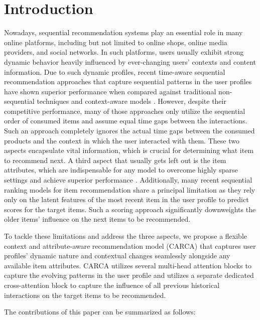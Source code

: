 \documentclass[sigconf,natbib=true]{acmart}
\begin{document}
\section{Introduction}
Nowadays, sequential recommendation systems play an essential role in many online platforms, including but not limited to online shops, online media providers, and social networks. In such platforms, users usually exhibit strong dynamic behavior heavily influenced by ever-changing users' contexts and content information. Due to such dynamic profiles, recent time-aware sequential recommendation approaches that capture sequential patterns in the user profiles \cite{kang2018self, ZhouWZZWZWW20,wu2020sse,wu2019stochastic,sun2019bert4rec} have shown superior performance when compared against traditional non-sequential techniques \cite{rendle2012bpr,song2019autoint} and context-aware models \cite{rendle2010factorization}. However, despite their competitive performance, many of those approaches only utilize the sequential order of consumed items and assume equal time gaps between the interactions. Such an approach completely ignores the actual time gaps between the consumed products and the context in which the user interacted with them. These two aspects encapsulate vital information, which is crucial for determining what item to recommend next. A third aspect that usually gets left out is the item attributes, which are indispensable for any model to overcome highly sparse settings and achieve superior performance \cite{ZhouWZZWZWW20,rashed2019attribute,rashed2020multirec,zhang2019feature}. Additionally, many recent sequential ranking models for item recommendation share a principal limitation as they rely only on the latent features of the most recent item in the user profile to predict scores for the target items. Such a scoring approach significantly downweights the older items' influence on the next items to be recommended.

To tackle these limitations and address the three aspects, we propose a flexible context and attribute-aware recommendation model (CARCA) that captures user profiles' dynamic nature and contextual changes seamlessly alongside any available item attributes. CARCA utilizes several multi-head attention blocks to capture the evolving patterns in the user profile and utilizes a separate dedicated cross-attention block to capture the influence of all previous historical interactions on the target items to be recommended. 

The contributions of this paper can be summarized as follows:
\end{document}
